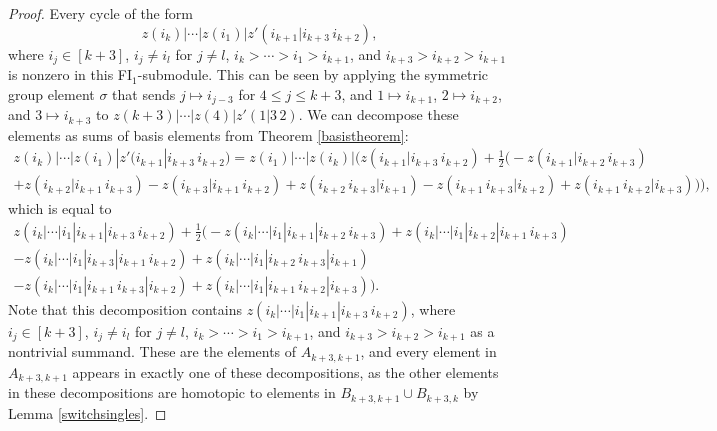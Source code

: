 \documentclass[12py]{amsart}%
\theoremstyle{definition}\newtheorem{definition}[thm]{Definition}
\theoremstyle{definition}
\begin{document}
\begin{proof}
Every cycle of the form
\[
z(i_{k})|\cdots|z(i_{1})|z'(i_{k+1}|i_{k+3}\,i_{k+2}),
\]
where $i_{j}\in [k+3]$, $i_{j}\neq i_{l}$ for $j\neq l$, $i_{k}>\cdots>i_{1}>i_{k+1}$, and $i_{k+3}>i_{k+2}>i_{k+1}$ is nonzero in this FI$_{1}$-submodule. This can be seen by applying the symmetric group element $\sigma$ that sends $j\mapsto i_{j-3}$ for $4\le j\le k+3$, and $1\mapsto i_{k+1}$, $2\mapsto i_{k+2}$, and $3\mapsto i_{k+3}$ to $z(k+3)|\cdots|z(4)|z'(1|3\,2)$. We can decompose these elements as sums of basis elements from Theorem \ref{basistheorem}:
\begin{multline*}
z(i_{k})|\cdots|z(i_{1})|z'(i_{k+1}|i_{k+3}\,i_{k+2})=z(i_{1})|\cdots|z(i_{k})|\Big(z(i_{k+1}|i_{k+3}\,i_{k+2})+\frac{1}{2}\big(-z(i_{k+1}|i_{k+2}\,i_{k+3})\\
+z(i_{k+2}|i_{k+1}\,i_{k+3})-z(i_{k+3}|i_{k+1}\,i_{k+2})+z(i_{k+2}\,i_{k+3}|i_{k+1})-z(i_{k+1}\,i_{k+3}|i_{k+2})+z(i_{k+1}\,i_{k+2}|i_{k+3})\big)\Big),
\end{multline*}
which is equal to
\begin{multline*}
z(i_{k}|\cdots|i_{1}|i_{k+1}|i_{k+3}\,i_{k+2})+\frac{1}{2}\big(-z(i_{k}|\cdots|i_{1}|i_{k+1}|i_{k+2}\,i_{k+3})+z(i_{k}|\cdots|i_{1}|i_{k+2}|i_{k+1}\,i_{k+3})\\-z(i_{k}|\cdots|i_{1}|i_{k+3}|i_{k+1}\,i_{k+2})
+z(i_{k}|\cdots|i_{1}|i_{k+2}\,i_{k+3}|i_{k+1})\\-z(i_{k}|\cdots|i_{1}|i_{k+1}\,i_{k+3}|i_{k+2})+z(i_{k}|\cdots|i_{1}|i_{k+1}\,i_{k+2}|i_{k+3})\big).
\end{multline*}
Note that this decomposition contains $z(i_{k}|\cdots|i_{1}|i_{k+1}|i_{k+3}\,i_{k+2})$, where $i_{j}\in [k+3]$, $i_{j}\neq i_{l}$ for $j\neq l$, $i_{k}>\cdots>i_{1}>i_{k+1}$, and $i_{k+3}>i_{k+2}>i_{k+1}$ as a nontrivial summand. These are the elements of  $A_{k+3,k+1}$, and every element in $A_{k+3,k+1}$ appears in exactly one of these decompositions, as the other elements in these decompositions are homotopic to elements in $B_{k+3,k+1}\cup B_{k+3,k}$ by Lemma \ref{switchsingles}.


\end{proof}
\end{document}
